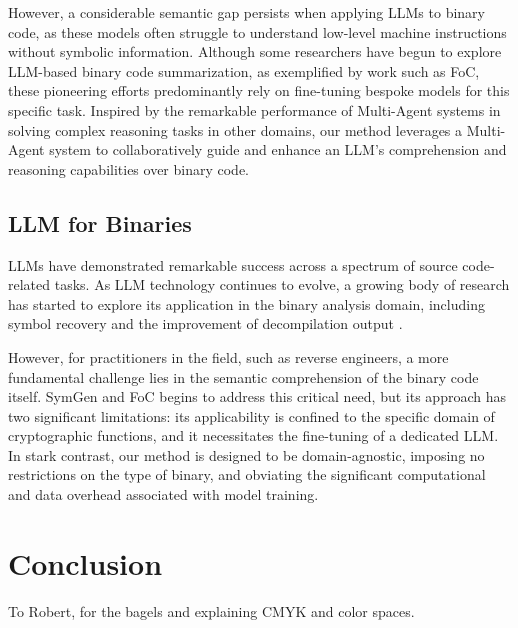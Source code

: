 \documentclass[acmsmall,screen,review,anonymous]{acmart} %
\begin{document}
However, a considerable semantic gap persists when applying LLMs to binary code, as these models often struggle to understand low-level machine instructions without symbolic information. Although some researchers have begun to explore LLM-based binary code summarization\cite{FoC}, as exemplified by work such as FoC\cite{FoC}, these pioneering efforts predominantly rely on fine-tuning bespoke models for this specific task. Inspired by the remarkable performance of Multi-Agent systems in solving complex reasoning tasks in other domains, our method leverages a Multi-Agent system to collaboratively guide and enhance an LLM's comprehension and reasoning capabilities over binary code.


\subsection{LLM for Binaries}
LLMs have demonstrated remarkable success across a spectrum of source code-related tasks\cite{LLM_cs, SimLLM, GPT_test, GPT_beyond_cg, LLM_ct}. As LLM technology continues to evolve, a growing body of research has started to explore its application in the binary analysis domain, including symbol recovery\cite{ReSym, HyRES, SymGen} and the improvement of decompilation output \cite{DeGPT, LLM4Decompile}.

However, for practitioners in the field, such as reverse engineers, a more fundamental challenge lies in the semantic comprehension of the binary code itself. SymGen\cite{SymGen} and FoC\cite{FoC} begins to address this critical need, but its approach has two significant limitations: its applicability is confined to the specific domain of cryptographic functions, and it necessitates the fine-tuning of a dedicated LLM. In stark contrast, our method is designed to be domain-agnostic, imposing no restrictions on the type of binary, and obviating the significant computational and data overhead associated with model training.



\section{Conclusion}




\begin{acks}
To Robert, for the bagels and explaining CMYK and color spaces.
\end{acks}
\end{document}
